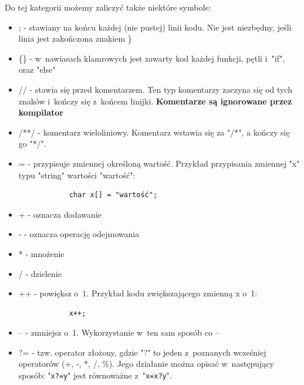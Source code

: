\documentclass[a4paper,12pt, twoside]{article}
\begin{document}
	Do tej kategorii możemy zaliczyć także niektóre symbole:
	\begin{itemize}
		\item ; - stawiany na końcu każdej (nie pustej) linii kodu. Nie jest niezbędny, jeśli linia jest zakończona znakiem \}
		\item \{\} - w~nawiasach klamrowych jest zawarty kod każdej funkcji, pętli i~"if", oraz "else"
		\item // - stawia się przed komentarzem. Ten typ komentarzy zaczyna się od tych znaków i~kończy się z~końcem linijki. \textbf{Komentarze są ignorowane przez kompilator} 
		\item /**/ - komentarz wieloliniowy. Komentarz wstawia się za "/*", a kończy się go "*/".
		\item = - przypisuje zmiennej określoną wartość. Przykład przypisania zmiennej "x" typu "string" wartości "wartość":
			\begin{verbatim}
			char x[] = "wartość";
			\end{verbatim}
		\item + - oznacza dodawanie
		\item - - oznacza operację odejmowania
		\item * - mnożenie
		\item / - dzielenie
		\item ++ - powiększ o~1. Przykład kodu zwiększającego zmienną x o~1:
			\begin{verbatim}
			x++;
			\end{verbatim}
		\item -- - zmniejsz o~1. Wykorzystanie w~ten sam sposób co --
		\item ?= - tzw. operator złożony, gdzie "?" to jeden z~poznanych wcześniej operatorów (+, -, *, /, \%). Jego działanie można opisać w~następujący sposób: "\verb|x?=y|" jest równoważne z~"\verb|x=x?y|".
	\end{itemize}
\end{document}
